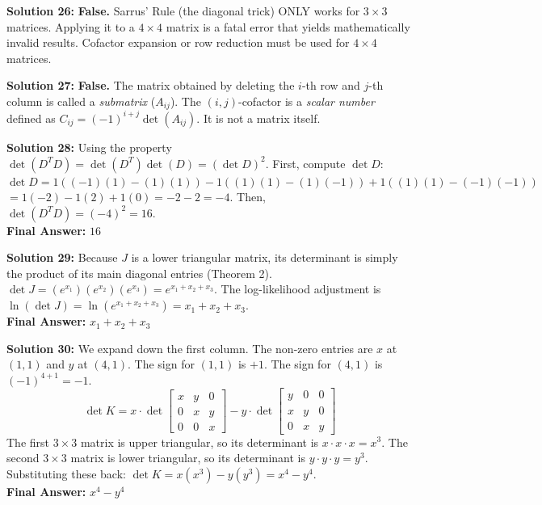 \documentclass[11pt]{article}
\begin{document}
\vspace{0.5cm}
\textbf{Solution 26:}
\textbf{False.} Sarrus' Rule (the diagonal trick) ONLY works for $3 \times 3$ matrices. Applying it to a $4 \times 4$ matrix is a fatal error that yields mathematically invalid results. Cofactor expansion or row reduction must be used for $4 \times 4$ matrices.

\vspace{0.5cm}
\textbf{Solution 27:}
\textbf{False.} The matrix obtained by deleting the $i$-th row and $j$-th column is called a \textit{submatrix} ($A_{ij}$). The $(i,j)$-cofactor is a \textit{scalar number} defined as $C_{ij} = (-1)^{i+j} \det(A_{ij})$. It is not a matrix itself.

\vspace{0.5cm}
\textbf{Solution 28:}
Using the property $\det(D^T D) = \det(D^T)\det(D) = (\det D)^2$.
First, compute $\det D$:
$\det D = 1((-1)(1) - (1)(1)) - 1((1)(1) - (1)(-1)) + 1((1)(1) - (-1)(-1))$
$= 1(-2) - 1(2) + 1(0) = -2 - 2 = -4$.
Then, $\det(D^T D) = (-4)^2 = 16$. \\
\textbf{Final Answer:} $16$

\vspace{0.5cm}
\textbf{Solution 29:}
Because $J$ is a lower triangular matrix, its determinant is simply the product of its main diagonal entries (Theorem 2).
$\det J = (e^{x_1})(e^{x_2})(e^{x_3}) = e^{x_1 + x_2 + x_3}$.
The log-likelihood adjustment is $\ln(\det J) = \ln(e^{x_1 + x_2 + x_3}) = x_1 + x_2 + x_3$. \\
\textbf{Final Answer:} $x_1 + x_2 + x_3$

\vspace{0.5cm}
\textbf{Solution 30:}
We expand down the first column. The non-zero entries are $x$ at $(1,1)$ and $y$ at $(4,1)$.
The sign for $(1,1)$ is $+1$. The sign for $(4,1)$ is $(-1)^{4+1} = -1$.
$$\det K = x \cdot \det \begin{bmatrix} x & y & 0 \\ 0 & x & y \\ 0 & 0 & x \end{bmatrix} - y \cdot \det \begin{bmatrix} y & 0 & 0 \\ x & y & 0 \\ 0 & x & y \end{bmatrix}$$
The first $3 \times 3$ matrix is upper triangular, so its determinant is $x \cdot x \cdot x = x^3$.
The second $3 \times 3$ matrix is lower triangular, so its determinant is $y \cdot y \cdot y = y^3$.
Substituting these back:
$\det K = x(x^3) - y(y^3) = x^4 - y^4$. \\
\textbf{Final Answer:} $x^4 - y^4$
\end{document}

